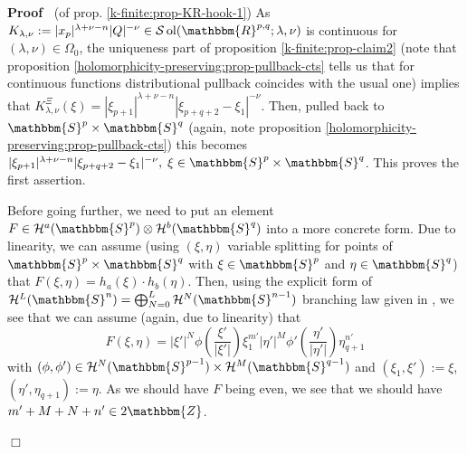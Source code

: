 \documentclass{article}
\newcommand{\assign}{:=}
\newcommand{\comma}{{,}}
\newcommand{\tmop}[1]{\ensuremath{\operatorname{#1}}}
\newenvironment{proof}{\noindent\textbf{Proof\ }}{\hspace*{\fill}$\Box$\medskip}
\numberwithin{definition}{section}
\numberwithin{lemma}{section}
\numberwithin{proposition}{section}
{\theorembodyfont{\rmfamily}\newtheorem{remark}{Remark}
\numberwithin{remark}{section}
}
\begin{document}
\begin{proof}
  (of prop. \ref{k-finite:prop-KR-hook-1}) As $K_{\lambda, \nu} \assign | x_p
  |^{\lambda + \nu - n} | Q |^{- \nu} \in \mathcal{S} \tmop{ol} (
  \mathbbm{R}^{p, q} ; \lambda, \nu)$ is continuous for $( \lambda, \nu) \in
  \Omega_0$, the uniqueness part of proposition \ref{k-finite:prop-claim2}
  (note that proposition \ref{holomorphicity-preserving:prop-pullback-cts}
  tells us that for continuous functions distributional pullback coincides
  with the usual one) implies that $K_{\lambda, \nu}^{\Xi} ( \xi) = | \xi_{p +
  1} |^{\lambda + \nu - n} | \xi_{p + q + 2} - \xi_1 |^{- \nu}$. Then, pulled
  back to $\mathbbm{S}^p \times \mathbbm{S}^q$ (again, note proposition
  \ref{holomorphicity-preserving:prop-pullback-cts}) this becomes $| \xi_{p +
  1} |^{\lambda + \nu - n} | \xi_{p + q + 2} - \xi_1 |^{- \nu}, \; \xi \in
  \mathbbm{S}^p \times \mathbbm{S}^q$. This proves the first assertion.
  
  Before going further, we need to put an element $F \in \mathcal{H}^a (
  \mathbbm{S}^p) \otimes \mathcal{H}^b ( \mathbbm{S}^q)$ into a more concrete
  form. Due to linearity, we can assume (using $( \xi, \eta)$ variable
  splitting for points of $\mathbbm{S}^p \times \mathbbm{S}^q$ with $\xi \in
  \mathbbm{S}^p$ and $\eta \in \mathbbm{S}^q$) that $F ( \xi \comma \eta) =
  h_a ( \xi) \cdot h_b ( \eta)$. Then, using the explicit form of
  $\mathcal{H}^L ( \mathbbm{S}^n) = \bigoplus_{N = 0}^L \mathcal{H}^N (
  \mathbbm{S}^{n - 1})$ branching law given in {\cite[sec
  4.2]{kobayashi2015symmetry}}, we see that we can assume (again, due to
  linearity) that
  \[ F ( \xi, \eta) = | \xi' |^N \phi \left( \frac{\xi'}{| \xi' |} \right)
     \xi_1^{m'} | \eta' |^M \phi' \left( \frac{\eta'}{| \eta' |} \right)
     \eta_{q + 1}^{n'} \]
  with $( \phi, \phi') \in \mathcal{H}^N ( \mathbbm{S}^{p - 1}) \times
  \mathcal{H}^M ( \mathbbm{S}^{q - 1})$ and $( \xi_1, \xi') \assign \xi$, $(
  \eta', \eta_{q + 1}) \assign \eta$. As we should have $F$ being even, we see
  that we should have $m' + M + N + n' \in 2\mathbbm{Z}$.
  

\end{proof}
\end{document}
